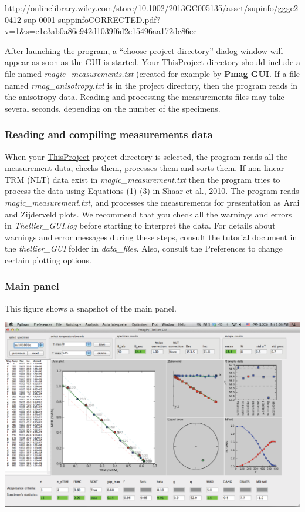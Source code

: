 \documentclass[11pt]{book}
\begin{document}
  \url{http://onlinelibrary.wiley.com/store/10.1002/2013GC005135/asset/supinfo/ggge20412-sup-0001-suppinfoCORRECTED.pdf?v=1&s=e1c3ab0a86c942d1039f6d2e15496aa172dc86ec}



After launching the program,  a  ``choose project directory'' dialog window will appear as soon as the GUI is started.
%
%
%
Your  \href{#Project_Directory}{ThisProject} directory should include a file named {\it magic\_measurements.txt} (created for example by \href{#pmag_gui.py}{\bf Pmag GUI}.   If a file named {\it rmag\_anisotropy.txt} is in the project directory, then the program reads in the anisotropy data. Reading and processing the measurements files may take several seconds, depending on the number of the specimens.


\subsubsection{Reading and compiling measurements data}
When your \href{#Project_Directory}{ThisProject}  project directory is selected, the program  reads all the measurement data, checks them, processes them and sorts them. If non-linear-TRM (NLT) data exist in {\it magic\_measurement.txt}  then the program tries to process the data using Equations (1)-(3) in \href{#http://dx.doi.org/MAGIC/doi/10.1016/j.epsl.2009.12.022}{Shaar et al., 2010}. \nocite{shaar10}  The program reads {\it magic\_measurement.txt}, and processes the measurements for presentation as Arai  and Zijderveld plots.
We recommend that you check all the warnings and errors in {\it Thellier\_GUI.log} before starting to interpret the data.  For details about warnings and error messages during these steps, consult the tutorial document in the {\it thellier\_GUI} folder in  {\it data\_files}.  Also, consult the Preferences to change certain plotting options.

\subsubsection{Main panel}

This figure shows a snapshot of the main panel.

	\includegraphics[width=30cm]{EPSFiles/Screenshot_main_panel.eps}
\end{document}
